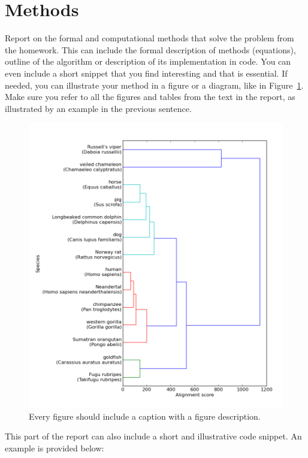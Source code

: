 \documentclass[a4paper,11pt]{article}
\begin{document}
\section{Methods}

Report on the formal and computational methods that solve the problem from the homework. This can include the formal description of methods (equations),  outline of the algorithm or description of its  implementation in code. You can even include a short snippet that you find interesting and that is essential. If needed, you can illustrate your method in a figure or a diagram, like in Figure~\ref{fig-example}. Make sure you refer to all the figures and tables from the text in the report, as illustrated by an example in the previous sentence.

\begin{figure}[htbp]
\begin{center}
\includegraphics[scale=0.7]{img/dendrogram-gap-11.png}
\caption{Every figure should include a caption with a figure description.}
\label{fig-example}
\end{center}
\end{figure}

This part of the report can also include a short and illustrative code snippet. An example is provided below:
\end{document}
